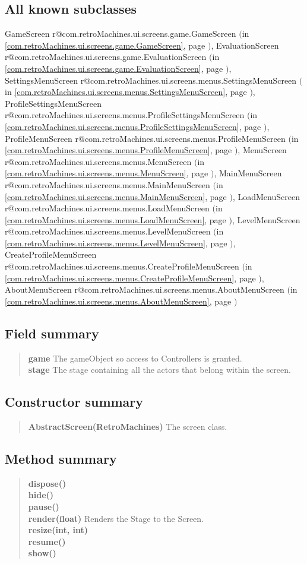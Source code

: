 \documentclass[11pt,a4paper]{report}
\makeatletter
\newcommand{\refdefined}[1]{
\expandafter\ifx\csname r@#1\endcsname\relax
\relax\else
{$($in \ref{#1}, page \pageref{#1}$)$}\fi}
\makeatother
\begin{document}
{{{{{{{{{{{\subsection{All known subclasses}{GameScreen\small{\refdefined{com.retroMachines.ui.screens.game.GameScreen}}, EvaluationScreen\small{\refdefined{com.retroMachines.ui.screens.game.EvaluationScreen}}, SettingsMenuScreen\small{\refdefined{com.retroMachines.ui.screens.menus.SettingsMenuScreen}}, ProfileSettingsMenuScreen\small{\refdefined{com.retroMachines.ui.screens.menus.ProfileSettingsMenuScreen}}, ProfileMenuScreen\small{\refdefined{com.retroMachines.ui.screens.menus.ProfileMenuScreen}}, MenuScreen\small{\refdefined{com.retroMachines.ui.screens.menus.MenuScreen}}, MainMenuScreen\small{\refdefined{com.retroMachines.ui.screens.menus.MainMenuScreen}}, LoadMenuScreen\small{\refdefined{com.retroMachines.ui.screens.menus.LoadMenuScreen}}, LevelMenuScreen\small{\refdefined{com.retroMachines.ui.screens.menus.LevelMenuScreen}}, CreateProfileMenuScreen\small{\refdefined{com.retroMachines.ui.screens.menus.CreateProfileMenuScreen}}, AboutMenuScreen\small{\refdefined{com.retroMachines.ui.screens.menus.AboutMenuScreen}}}
\subsection{Field summary}{
\begin{verse}
{\bf game} The gameObject so access to Controllers is granted.\\
{\bf stage} The stage containing all the actors that belong within the screen.\\
\end{verse}
}
\subsection{Constructor summary}{
\begin{verse}
{\bf AbstractScreen(RetroMachines)} The screen class.\\
\end{verse}
}
\subsection{Method summary}{
\begin{verse}
{\bf dispose()} \\
{\bf hide()} \\
{\bf pause()} \\
{\bf render(float)} Renders the Stage to the Screen.\\
{\bf resize(int, int)} \\
{\bf resume()} \\
{\bf show()} \\
\end{verse}
}
}}}}}}}}}}}
\end{document}

